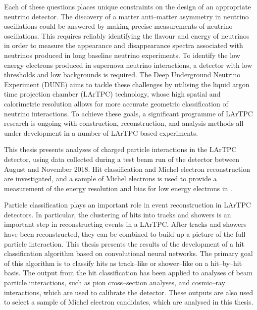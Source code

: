 Each of these questions places unique constraints on the design of an
appropriate neutrino detector. The discovery of a matter anti--matter asymmetry
in neutrino oscillations could be answered by making precise measurements of
neutrino oscillations. This requires reliably identifying the flavour and energy
of neutrinos in order to measure the appearance and disappearance spectra
associated with neutrinos produced in long baseline neutrino experiments. To
identify the low energy electrons produced in supernova neutrino interactions, a
detector with low thresholds and low backgrounds is required. The Deep
Underground Neutrino Experiment (DUNE) aims to tackle these challenges by
utilising the liquid argon time projection chamber (LArTPC) technology, whose
high spatial and calorimetric resolution allows for more accurate geometric
classification of neutrino interactions. To achieve these goals, a significant 
programme of LArTPC research is ongoing with construction, reconstruction, and 
analysis methods all under development in a number of LArTPC based 
experiments\cite{Acciarri:2016smi, Cavanna:2014iqa, Antonello:2015lea, 
Abi:2017aow}. 

This thesis presents analyses of charged particle interactions in the
\protodune{} LArTPC detector, using data collected during a test beam run of the
detector between August and November 2018. Hit classification and Michel 
electron reconstruction are investigated, and a sample of Michel electrons is 
used to provide a measurement of the energy resolution and bias for low energy 
electrons in \protodune{}.

Particle classification plays an important role in event reconstruction in 
LArTPC detectors. In particular, the clustering of hits into tracks and 
showers is an important step in reconstructing events in a LArTPC. After tracks
and showers have been reconstructed, they can be combined to build up a picture
of the full particle interaction. This thesis presents the results of the 
development of a hit classification algorithm based on convolutional neural
networks. The primary goal of this algorithm is to classify hits as 
track--like or shower--like on a hit--by--hit basis. The output from the hit 
classification has been applied to analyses of beam particle interactions, 
such as pion cross--section analyses, and cosmic--ray interactions, which 
are used to calibrate the \protodune{} detector. These outputs are also used 
to select a sample of Michel electron candidates, which are analysed in this 
thesis.


